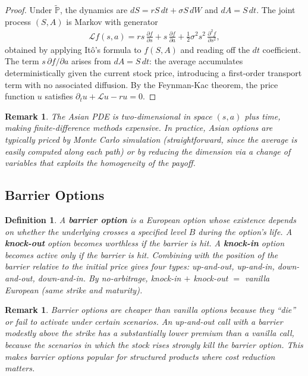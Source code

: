 \documentclass{report}
\theoremstyle{spacedplain}
\theoremstyle{spaceddefinition}
\newtheorem{definition}[theorem]{Definition}
\theoremstyle{spacedremark}
\newtheorem{remark}[theorem]{Remark}
\begin{document}
\begin{proof}
Under $\widetilde{\mathbb{P}}$, the dynamics are $dS = rS\,dt + \sigma S\,dW$ and $dA = S\,dt$. The joint process $(S,A)$ is Markov with generator
\begin{align}
    \mathcal{L}f(s,a) = rs\,\frac{\partial f}{\partial s} + s\,\frac{\partial f}{\partial a} + \frac{1}{2}\sigma^2 s^2\,\frac{\partial^2 f}{\partial s^2},
\end{align}
obtained by applying It\^o's formula to $f(S,A)$ and reading off the $dt$ coefficient. The term $s\,\partial f/\partial a$ arises from $dA = S\,dt$: the average accumulates deterministically given the current stock price, introducing a first-order transport term with no associated diffusion. By the Feynman-Kac theorem, the price function $u$ satisfies $\partial_t u + \mathcal{L}u - ru = 0$.
\end{proof}

\begin{remark}
The Asian PDE is two-dimensional in space $(s,a)$ plus time, making finite-difference methods expensive. In practice, Asian options are typically priced by Monte Carlo simulation (straightforward, since the average is easily computed along each path) or by reducing the dimension via a change of variables that exploits the homogeneity of the payoff.
\end{remark}


\subsection{Barrier Options}

\begin{definition}
A \textbf{barrier option} is a European option whose existence depends on whether the underlying crosses a specified level $B$ during the option's life.
A \textbf{knock-out} option becomes worthless if the barrier is hit. A \textbf{knock-in} option becomes active only if the barrier is hit. Combining with the position of the barrier relative to the initial price gives four types: up-and-out, up-and-in, down-and-out, down-and-in. By no-arbitrage, knock-in $+$ knock-out $=$ vanilla European (same strike and maturity).
\end{definition}

\begin{remark}
Barrier options are cheaper than vanilla options because they ``die'' or fail to activate under certain scenarios. An up-and-out call with a barrier modestly above the strike has a substantially lower premium than a vanilla call, because the scenarios in which the stock rises strongly kill the barrier option. This makes barrier options popular for structured products where cost reduction matters.
\end{remark}
\end{document}

